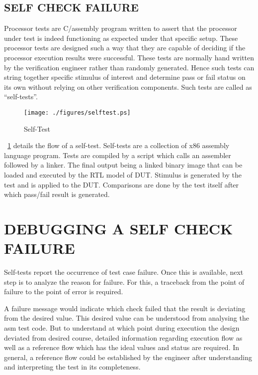 \subsection {SELF CHECK FAILURE}

Processor tests are C/assembly program written to assert that the processor under test is indeed functioning as expected under that specific setup. These processor tests are designed such a way that they are capable of deciding if the processor execution results were successful. These tests are normally hand written by the verification engineer rather than randomly generated.  Hence such tests can string together specific stimulus of interest and determine pass or fail status on its own without relying on other verification components. Such tests are called as ``self-tests''.


\begin{figure}[h]
\centering
\texttt{[image: ./figures/selftest.ps]}
\caption{Self-Test} 
\label{fig:selftest.ps}
\end{figure}

\figurename~{\ref{fig:selftest.ps}} details the flow of a self-test. Self-tests are a collection of x86 assembly language program. Tests are compiled by a script which calls an assembler followed by a linker. The final output being a linked binary image that can be loaded and executed by the RTL model of DUT. Stimulus is generated by the test and is applied to the DUT. Comparisons are done by the test itself after which pass/fail result is generated.



\section{DEBUGGING A SELF CHECK FAILURE}

Self-tests report the occurrence of test case failure. Once this is available, next step is to analyze the reason for failure.  For this, a traceback from the point of failure to the point of error is required. 

A failure message would indicate which check failed that the result is deviating from the desired value. This desired value can be understood from analysing the asm test code. But to understand at which point during execution the design deviated from desired course, detailed information regarding execution flow as well as a reference flow which has the ideal values and status are required. In general, a reference flow could be established by the engineer after understanding and interpreting the test in its completeness.
 
